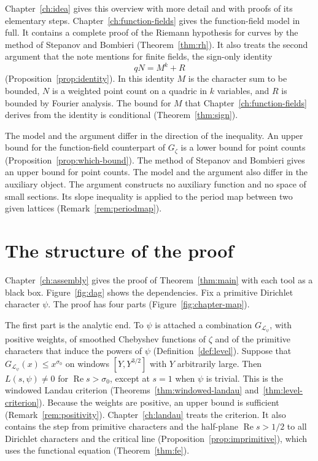 \documentclass[11pt]{amsbook}
\theoremstyle{plain}
\theoremstyle{definition}
\theoremstyle{remark}
\numberwithin{equation}{section}
\numberwithin{figure}{chapter}
\numberwithin{table}{chapter}
\newcommand{\lev}{\mathscr{L}}
\newcommand{\Gz}{G_{\zeta}}
\begin{document}
Chapter~\ref{ch:idea} gives this overview with more detail and
with proofs of its elementary steps.
Chapter~\ref{ch:function-fields} gives the function-field model in
full. It contains a complete proof of the Riemann hypothesis for
curves by the method of Stepanov and Bombieri
(Theorem~\ref{thm:rh}). It also treats the second argument that the
note mentions for finite fields, the sign-only identity
\[
  qN=M^k+R
\]
(Proposition~\ref{prop:identity}). In this identity $M$ is the
character sum to be bounded, $N$ is a weighted point count on a
quadric in $k$ variables, and $R$ is bounded by Fourier analysis.
The bound for $M$ that Chapter~\ref{ch:function-fields} derives
from the identity is conditional (Theorem~\ref{thm:sign}).

The model and the argument differ in the direction of the
inequality. An upper bound for the function-field counterpart of
$\Gz$ is a lower bound for point counts
(Proposition~\ref{prop:which-bound}). The method of Stepanov and
Bombieri gives an upper bound for point counts. The model and the
argument also differ in the auxiliary object. The argument
constructs no auxiliary function and no space of small sections.
Its slope inequality is applied to the period map between two
given lattices (Remark~\ref{rem:periodmap}).

\section*{The structure of the proof}

Chapter~\ref{ch:assembly} gives the proof of
Theorem~\ref{thm:main} with each tool as a black box.
Figure~\ref{fig:dag} shows the dependencies. Fix a primitive
Dirichlet character $\psi$. The proof has four parts (Figure~\ref{fig:chapter-map}).

The first part is the analytic end. To $\psi$ is attached a
combination
$G_{\lev_\psi}$, with positive weights, of smoothed Chebyshev
functions of $\zeta$ and of the primitive characters that induce
the powers of $\psi$ (Definition~\ref{def:level}). Suppose that
$G_{\lev_\psi}(x)\le x^{\sigma_0}$ on windows $[Y,Y^{3/2}]$ with
$Y$ arbitrarily large. Then $L(s,\psi)\ne0$ for
$\operatorname{Re}s>\sigma_0$, except at $s=1$ when $\psi$ is
trivial. This is the windowed Landau
criterion (Theorems~\ref{thm:windowed-landau}
and~\ref{thm:level-criterion}). Because the weights are positive,
an upper bound is sufficient (Remark~\ref{rem:positivity}).
Chapter~\ref{ch:landau} treats the criterion. It also contains the
step from primitive characters and the half-plane
$\operatorname{Re}s>1/2$ to all Dirichlet characters and the
critical line (Proposition~\ref{prop:imprimitive}), which uses the
functional equation (Theorem~\ref{thm:fe}).
\end{document}
